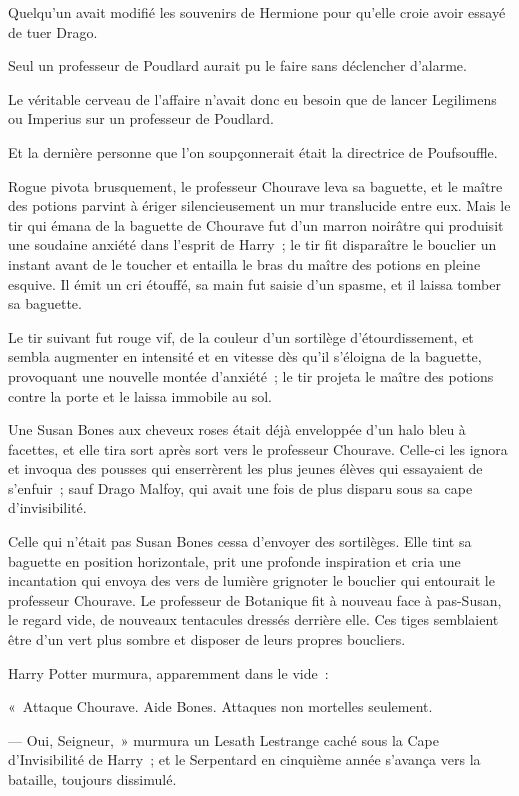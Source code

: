 Quelqu'un avait modifié les souvenirs de Hermione pour qu'elle croie avoir essayé de tuer Drago.

Seul un professeur de Poudlard aurait pu le faire sans déclencher d'alarme.

Le véritable cerveau de l'affaire n'avait donc eu besoin que de lancer Legilimens ou Imperius sur un professeur de Poudlard.

Et la dernière personne que l'on soupçonnerait était la directrice de Poufsouffle.

Rogue pivota brusquement, le professeur Chourave leva sa baguette, et le maître des potions parvint à ériger silencieusement un mur translucide entre eux. Mais le tir qui émana de la baguette de Chourave fut d'un marron noirâtre qui produisit une soudaine anxiété dans l'esprit de Harry~; le tir fit disparaître le bouclier un instant avant de le toucher et entailla le bras du maître des potions en pleine esquive. Il émit un cri étouffé, sa main fut saisie d'un spasme, et il laissa tomber sa baguette.

Le tir suivant fut rouge vif, de la couleur d'un sortilège d'étourdissement, et sembla augmenter en intensité et en vitesse dès qu'il s'éloigna de la baguette, provoquant une nouvelle montée d'anxiété~; le tir projeta le maître des potions contre la porte et le laissa immobile au sol.

Une Susan Bones aux cheveux roses était déjà enveloppée d'un halo bleu à facettes, et elle tira sort après sort vers le professeur Chourave. Celle-ci les ignora et invoqua des pousses qui enserrèrent les plus jeunes élèves qui essayaient de s'enfuir~; sauf Drago Malfoy, qui avait une fois de plus disparu sous sa cape d'invisibilité.

Celle qui n'était pas Susan Bones cessa d'envoyer des sortilèges. Elle tint sa baguette en position horizontale, prit une profonde inspiration et cria une incantation qui envoya des vers de lumière grignoter le bouclier qui entourait le professeur Chourave. Le professeur de Botanique fit à nouveau face à pas-Susan, le regard vide, de nouveaux tentacules dressés derrière elle. Ces tiges semblaient être d'un vert plus sombre et disposer de leurs propres boucliers.

Harry Potter murmura, apparemment dans le vide~:

«~Attaque Chourave. Aide Bones. Attaques non mortelles seulement.

--- Oui, Seigneur,~» murmura un Lesath Lestrange caché sous la Cape d'Invisibilité de Harry~; et le Serpentard en cinquième année s'avança vers la bataille, toujours dissimulé.

